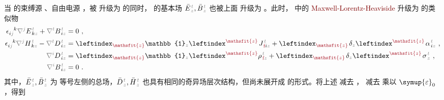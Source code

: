 当  的束缚源 、自由电源 ，被  升级为  的同时， 的基本场 $\bar{E}^{\;\!\mathcolor{gray}{t}}_{\;\!\mathcolor{gray}{z}}, \bar{B}^{\;\!\mathcolor{gray}{t}}_{\;\!\mathcolor{gray}{z}}$ 也被上面  升级为 。此时， 中的 \textcolor{Maroon}{Maxwell-Lorentz-Heaviside}  升级为  的类似物
\begin{subequations} \label{eq:curl-EH}
\begin{align}
	\epsilon^{\hphantom{ij}k}_{i\mathcolor{gray}{j}} \mathcolor{gray}{\nabla^j} E^{\;\!\mathcolor{gray}{t}}_{\;\! k\mathcolor{gray}{z}} + \mathcolor{gray}{\nabla^t} B^{\;\!\mathcolor{gray}{t}}_{\;\! i\mathcolor{gray}{z}} &= 0~, \label{eq:curl-E'duplicate} \\
	\epsilon^{\hphantom{ij}k}_{i\mathcolor{gray}{j}} \mathcolor{gray}{\nabla^j} H^{\;\!\mathcolor{gray}{t}}_{\;\! k\mathcolor{gray}{z}} - \mathcolor{gray}{\nabla^t} D^{\;\!\mathcolor{gray}{t}}_{\;\! i\mathcolor{gray}{z}} &= \leftindex_{\textcolor{Maroon}{\mathsfit{z}}} {\mathbb{1}}_{\mathcolor{gray}{z}} \leftindex^{\textcolor{Maroon}{\mathsfit{z}}} \;\! J^{\;\!\mathcolor{gray}{t}}_{\;\!\textcolor{Maroon}{\text{f}} i\mathcolor{gray}{z}} + \leftindex_{\textcolor{Maroon}{\mathsfit{z}}} \;\! \delta_{\mathcolor{gray}{z}} \leftindex^{\textcolor{Maroon}{\mathsfit{z}}} \;\!
	{\alpha}^{\;\!\mathcolor{gray}{t}}_{\;\! i\mathcolor{gray}{z}} ~, \label{eq:curl-H'} \\
	\mathcolor{gray}{\nabla^i} D^{\;\!\mathcolor{gray}{t}}_{\;\! i\mathcolor{gray}{z}} &= \leftindex_{\textcolor{Maroon}{\mathsfit{z}}} {\mathbb{1}}_{\mathcolor{gray}{z}} \leftindex^{\textcolor{Maroon}{\mathsfit{z}}} {\rho}^{\;\!\mathcolor{gray}{t}}_{\;\!\textcolor{Maroon}{\text{f}}\mathcolor{gray}{z}} + \leftindex_{\textcolor{Maroon}{\mathsfit{z}}} \;\! \delta_{\mathcolor{gray}{z}} \leftindex^{\textcolor{Maroon}{\mathsfit{z}}} \;\! {\sigma}^{\;\!\mathcolor{gray}{t}}_{\;\! \mathcolor{gray}{z}}~, \label{eq:div-D'} \\
	\mathcolor{gray}{\nabla^i} B^{\;\!\mathcolor{gray}{t}}_{\;\! i\mathcolor{gray}{z}} &= 0~. \label{eq:div-B'duplicate}
\end{align}
\end{subequations}
其中，$\bar{E}^{\;\!\mathcolor{gray}{t}}_{\;\!\mathcolor{gray}{z}}, \bar{B}^{\;\!\mathcolor{gray}{t}}_{\;\!\mathcolor{gray}{z}}$ 为  等号左侧的总场，$\bar{D}^{\;\!\mathcolor{gray}{t}}_{\;\!\mathcolor{gray}{z}}, \bar{H}^{\;\!\mathcolor{gray}{t}}_{\;\!\mathcolor{gray}{z}}$ 也具有相同的奇异场层次结构，但尚未展开成  的形式。将上述  减去 ， 减去  乘以 ${\symup{\varepsilon}}_0$，得到
